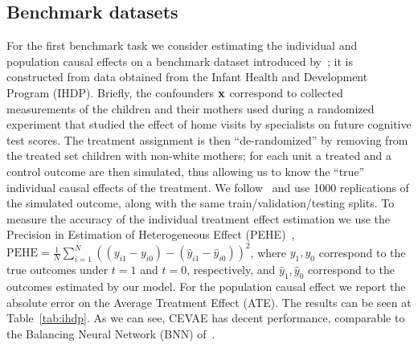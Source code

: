 \subsection{Benchmark datasets}
For the first benchmark task we consider estimating the individual and population causal effects on a benchmark dataset introduced by~\cite{hill2011bayesian}; it is constructed from data obtained from the Infant Health and Development Program (IHDP). Briefly, the confounders $\mathbf{x}$ correspond to collected measurements of the children and their mothers used during a randomized experiment that studied the effect of home visits by specialists on future cognitive test scores. The treatment assignment is then ``de-randomized'' by removing from the treated set children with non-white mothers; for each unit a treated and a control outcome are then simulated, thus allowing us to know the ``true'' individual causal effects of the treatment. 
We follow~\cite{johansson2016learning,shalit2016estimating} and use 1000 replications of the simulated outcome, along with the same train/validation/testing splits. To measure the accuracy of the individual treatment effect estimation we use the Precision in Estimation of Heterogeneous Effect (PEHE)~\citep{hill2011bayesian}, $\text{PEHE} = \frac{1}{N}\sum_{i=1}^{N}((y_{i1} - y_{i0}) - (\hat{y}_{i1} - \hat{y}_{i0}))^2$, where $y_1, y_0$ correspond to the true outcomes under $t=1$ and $t=0$, respectively, and $\hat{y}_1, \hat{y}_0$ correspond to the outcomes estimated by our model. For the population causal effect we report the absolute error on the Average Treatment Effect (ATE). The results can be seen at Table~\ref{tab:ihdp}. As we can see, CEVAE has decent performance, comparable to the Balancing Neural Network (BNN) of~\cite{johansson2016learning}. 

